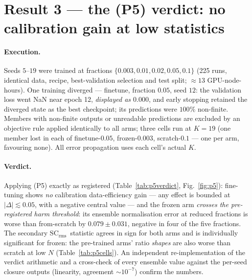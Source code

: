 \documentclass[11pt]{article}
\newcommand{\SCr}{\ensuremath{\mathrm{SC_{rms}}}}
\begin{document}
\section{Result 3 --- the (P5) verdict: no calibration gain at low statistics}
\label{sec:p5}

\paragraph{Execution.} Seeds $5$--$19$ were trained at fractions
$\{0.003, 0.01, 0.02, 0.05, 0.1\}$ (225 runs, identical data, recipe,
best-validation selection and test split; $\approx 13$ GPU-node-hours). One training
diverged --- finetune, fraction $0.05$, seed $12$: the validation loss went NaN near
epoch 12, \emph{displayed as $0.000$}, and early stopping retained the diverged state as
the best checkpoint; its predictions were $100\%$ non-finite. Members with non-finite
outputs or unreadable predictions are excluded by an objective rule applied identically
to all arms; three cells run at $K{=}19$ (one member lost in each of finetune-$0.05$,
frozen-$0.003$, scratch-$0.1$ --- one per arm, favouring none). All error propagation
uses each cell's actual $K$.

\paragraph{Verdict.} Applying (P5) exactly as registered
(Table~\ref{tab:p5verdict}, Fig.~\ref{fig:p5}): fine-tuning shows \emph{no} calibration data-efficiency
gain --- any effect is bounded at $|\Delta| \lesssim 0.05$, with a negative central
value --- and the frozen arm \emph{crosses the pre-registered harm threshold}: its
ensemble normalisation error at reduced fractions is worse than from-scratch by
$0.079 \pm 0.031$, negative in four of the five fractions. The secondary \SCr\ statistic
agrees in sign for both arms and is individually significant for frozen: the pre-trained
arms' ratio \emph{shapes} are also worse than scratch at low $N$
(Table~\ref{tab:p5cells}). An independent re-implementation of the verdict arithmetic
and a cross-check of every ensemble value against the per-seed closure outputs
(linearity, agreement $\sim 10^{-7}$) confirm the numbers.
\end{document}
